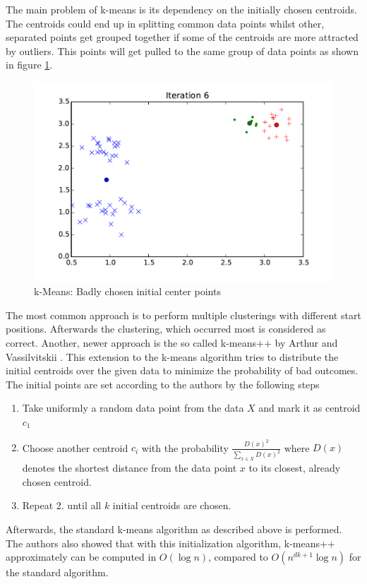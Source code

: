 
The main problem of k-means is its dependency on the initially chosen centroids. The centroids could end up in splitting common data points whilst other, separated points get grouped together if some of the centroids are more attracted by outliers. This points will get pulled to the same group of data points as shown in figure \ref{fig:kmeans_bad}.


\begin{figure}[h]
\centering
\includegraphics[width=0.5\linewidth]{img/kmeans_bad}
\caption{k-Means: Badly chosen initial center points}
\label{fig:kmeans_bad}
\end{figure}

The most common approach is to perform multiple clusterings with different start positions. Afterwards the clustering, which occurred most is considered as correct. Another, newer approach is the so called k-means++ by Arthur and Vassilvitskii \cite{Arthur}. This extension to the k-means algorithm tries to distribute the initial centroids over the given data to minimize the probability of bad outcomes. The initial points are set according to the authors by the following steps

\begin{enumerate}
    \item Take uniformly a random data point from the data $X$ and mark it as centroid $c_1$
    \item Choose another centroid $c_i$ with the probability $\frac{D(x)^2}{\sum_{x \in X} D(x)^2}$ where $D(x)$ denotes the shortest distance from the data point $x$ to its closest, already chosen centroid.
    \item Repeat 2. until all $k$ initial centroids are chosen.
\end{enumerate}
Afterwards, the standard k-means algorithm as described above is performed. The authors also showed that with this initialization algorithm, k-means++ approximately can be computed in $O(\log n)$, compared to $O(n^{dk+1} \log n)$ for the standard algorithm.



